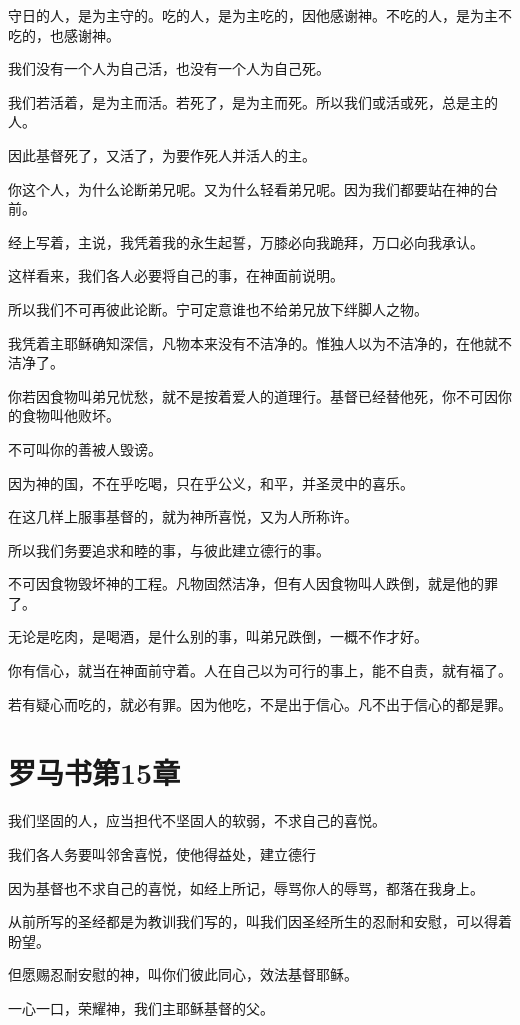 \documentclass[12pt,oneside]{book}
\begin{document}
守日的人，是为主守的。吃的人，是为主吃的，因他感谢神。不吃的人，是为主不吃的，也感谢神。

我们没有一个人为自己活，也没有一个人为自己死。

我们若活着，是为主而活。若死了，是为主而死。所以我们或活或死，总是主的人。

因此基督死了，又活了，为要作死人并活人的主。

你这个人，为什么论断弟兄呢。又为什么轻看弟兄呢。因为我们都要站在神的台前。

经上写着，主说，我凭着我的永生起誓，万膝必向我跪拜，万口必向我承认。

这样看来，我们各人必要将自己的事，在神面前说明。

所以我们不可再彼此论断。宁可定意谁也不给弟兄放下绊脚人之物。

我凭着主耶稣确知深信，凡物本来没有不洁净的。惟独人以为不洁净的，在他就不洁净了。

你若因食物叫弟兄忧愁，就不是按着爱人的道理行。基督已经替他死，你不可因你的食物叫他败坏。

不可叫你的善被人毁谤。

因为神的国，不在乎吃喝，只在乎公义，和平，并圣灵中的喜乐。

在这几样上服事基督的，就为神所喜悦，又为人所称许。

所以我们务要追求和睦的事，与彼此建立德行的事。

不可因食物毁坏神的工程。凡物固然洁净，但有人因食物叫人跌倒，就是他的罪了。

无论是吃肉，是喝酒，是什么别的事，叫弟兄跌倒，一概不作才好。

你有信心，就当在神面前守着。人在自己以为可行的事上，能不自责，就有福了。

若有疑心而吃的，就必有罪。因为他吃，不是出于信心。凡不出于信心的都是罪。

\chapter{罗马书第15章}
我们坚固的人，应当担代不坚固人的软弱，不求自己的喜悦。

我们各人务要叫邻舍喜悦，使他得益处，建立德行

因为基督也不求自己的喜悦，如经上所记，辱骂你人的辱骂，都落在我身上。

从前所写的圣经都是为教训我们写的，叫我们因圣经所生的忍耐和安慰，可以得着盼望。

但愿赐忍耐安慰的神，叫你们彼此同心，效法基督耶稣。

一心一口，荣耀神，我们主耶稣基督的父。
\end{document}
